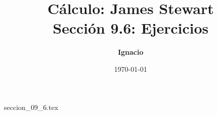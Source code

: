 \documentclass[11pt,spanish,oneside]{report}
\title{\textbf{Cálculo: James Stewart} \\ \Large Sección 9.6: Ejercicios}
\author{\textbf{Ignacio}}
\date{\today}
\begin{document}
\maketitle

{seccion_09_6.tex}
\end{document}
